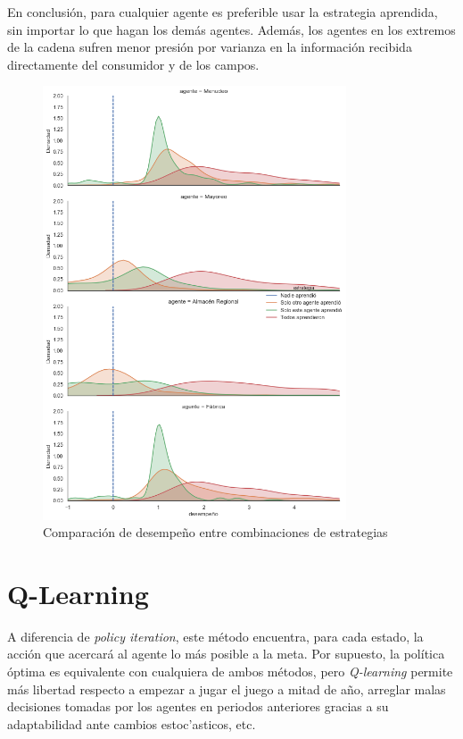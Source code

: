 En conclusi\'on, para cualquier agente es preferible usar la estrategia aprendida, sin importar lo que hagan los dem\'as agentes. Adem\'as, los agentes en los extremos de la cadena sufren menor presi\'on por varianza en la informaci\'on recibida directamente del consumidor y de los campos.\\



\begin{figure}[H]
\caption{Comparaci\'on de desempe\~no entre combinaciones de estrategias}
\label{ev_policies_dumb}
\includegraphics[width=9cm]{tesis_tex/figs/evaluating_policies_dumb_to_smart.png}
\centering
\end{figure}

\section{Q-Learning}

A diferencia de \textit{policy iteration}, este m\'etodo encuentra, para cada estado, la acci\'on que acercar\'a al agente lo m\'as posible a la meta. Por supuesto, la pol\'itica \'optima es equivalente con cualquiera de ambos m\'etodos, pero \textit{Q-learning} permite m\'as libertad respecto a empezar a jugar el juego a mitad de a\~no, arreglar malas decisiones tomadas por los agentes en periodos anteriores gracias a su adaptabilidad ante cambios estoc'asticos, etc.\\

